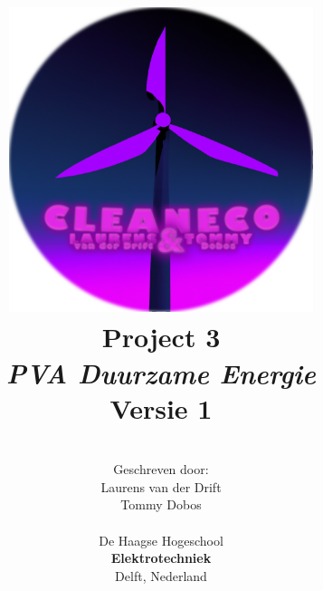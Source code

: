 \title{
\includegraphics[width=3.5in]{IMG/logo/finalcircle.png} \\
\vspace*{1in}
\textbf{Project 3}\\
\textit{PVA Duurzame Energie}\\
Versie 1
}
\author{
\vspace*{1in} \\
  Geschreven door:\\
  Laurens van der Drift\\
  Tommy Dobos\\
		\vspace*{0.2in} \\
		De Haagse Hogeschool\\
        \textbf{Elektrotechniek}\\
        Delft, Nederland
       } 
